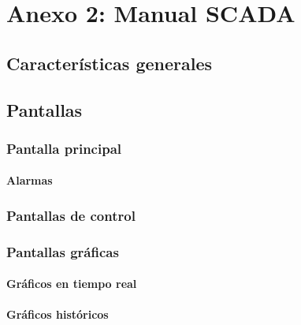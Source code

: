 


\section{Anexo 2: Manual SCADA}
\subsection{Características generales}
\subsection{Pantallas}
\subsubsection{Pantalla principal}
\paragraph{Alarmas}
\subsubsection{Pantallas de control}
\subsubsection{Pantallas gráficas}
\paragraph{Gráficos en tiempo real}
\paragraph{Gráficos históricos}



\newpage